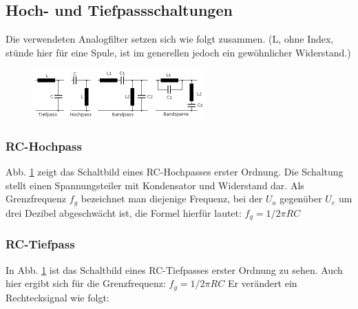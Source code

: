 \subsection{Hoch- und Tiefpassschaltungen}
Die verwendeten Analogfilter setzen sich wie folgt zusammen.
(L, ohne Index, stünde hier für eine Spule, ist im generellen jedoch ein gewöhnlicher Widerstand.)
\begin{figure}[H]
    \centering
    \includegraphics[width=\textwidth]{Abb/pass.pdf} 
    \label{pass}
\end{figure}

\subsubsection{RC-Hochpass}
Abb. \ref{pass} zeigt das Schaltbild eines RC-Hochpasses erster Ordnung. Die Schaltung stellt einen Spannungsteiler mit Kondensator und Widerstand dar.
Als Grenzfrequenz $f_g$ bezeichnet man diejenige Frequenz, bei der $U_a$ gegenüber $U_e$ um drei Dezibel abgeschwächt ist, die Formel hierfür lautet: $f_g=1/2\pi R C$

\subsubsection{RC-Tiefpass}

In Abb. \ref{pass} ist das Schaltbild eines RC-Tiefpasses erster Ordnung zu sehen. Auch hier ergibt sich für die Grenzfrequenz: $f_g=1/2 \pi RC$
Er verändert ein Rechtecksignal wie folgt:


